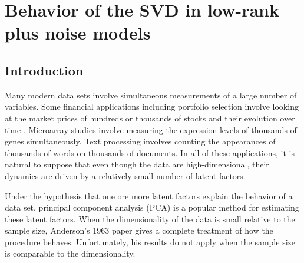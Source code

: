 
\chapter{Behavior of the SVD in low-rank plus noise models}


\newcommand{\ba}{\boldsymbol{a}}      
\newcommand{\be}{\boldsymbol{e}}      
\newcommand{\bo}{\boldsymbol{o}}      
\newcommand{\bu}{\boldsymbol{u}}      
\newcommand{\bv}{\boldsymbol{v}}
\newcommand{\by}{\boldsymbol{y}}
\newcommand{\bz}{\boldsymbol{z}}
\newcommand{\bS}{\boldsymbol{S}}
\newcommand{\bW}{\boldsymbol{W}}
\newcommand{\bX}{\boldsymbol{X}}

\newcommand{\tPsi}{\tilde \Psi}       %

\newcommand{\F}{\mathcal{F}}          %
\newcommand{\N}{\mathcal{N}}          %
\newcommand{\Q}{\mathcal{Q}}
\newcommand{\U}{\mathcal{U}}          %
\newcommand{\V}{\mathcal{V}}
\newcommand{\W}{\mathcal{W}}


\newcommand{\half}{\frac{1}{2}}
\newcommand{\Thalf}{\frac{T}{2}}
\newcommand{\fourth}{\frac{1}{4}}


\section{Introduction}

Many modern data sets involve simultaneous measurements of a large number of
variables. Some financial applications including portfolio selection involve
looking at the market prices of hundreds or thousands of stocks and their
evolution over time \cite{markowitz1952ps}. Microarray studies
\cite{biotechnol1995sms} involve measuring the expression levels of thousands of
genes simultaneously. Text processing \cite{manning1999fsn} involves counting
the appearances of thousands of words on thousands of documents. In all of these
applications, it is natural to suppose that even though the data are
high-dimensional, their dynamics are driven by a relatively small number of
latent factors.

Under the hypothesis that one ore more latent factors explain the behavior
of a data set, principal component analysis (PCA) \cite{jolliffe2002pca} is a
popular method for estimating these latent factors.  When the dimensionality
of the data is small relative to the sample size, Anderson's 1963 paper
\cite{anderson1963atp} gives a complete treatment of how the procedure
behaves.  Unfortunately, his results do not apply when the sample size is
comparable to the dimensionality.

